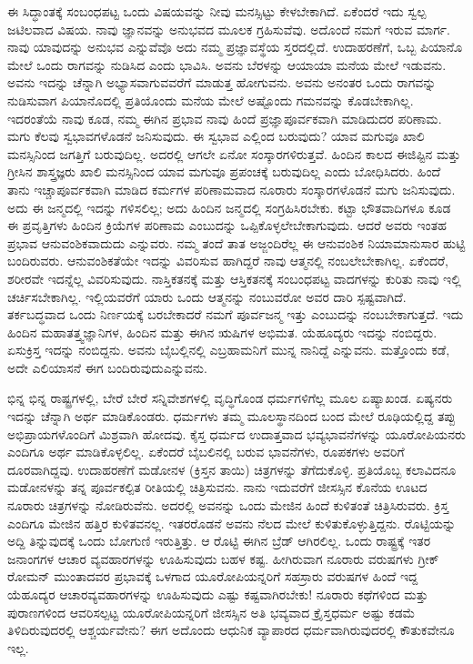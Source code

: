 ಈ ಸಿದ್ಧಾಂತಕ್ಕೆ ಸಂಬಂಧಪಟ್ಟ ಒಂದು ವಿಷಯವನ್ನು ನೀವು ಮನಸ್ಸಿಟ್ಟು ಕೇಳಬೇಕಾಗಿದೆ. ಏಕೆಂದರೆ ಇದು ಸ್ವಲ್ಪ ಜಟಿಲವಾದ ವಿಷಯ. ನಾವು ಜ್ಞಾನವನ್ನು ಅನುಭವದ ಮೂಲಕ ಗ್ರಹಿಸುವೆವು. ಅದೊಂದೆ ನಮಗೆ ಇರುವ ಮಾರ್ಗ. ನಾವು ಯಾವುದನ್ನು ಅನುಭವ ಎನ್ನುವೆವೊ ಅದು ನಮ್ಮ ಪ್ರಜ್ಞಾವಸ್ಥೆಯ ಸ್ತರದಲ್ಲಿದೆ. ಉದಾಹರಣೆಗೆ, ಒಬ್ಬ ಪಿಯಾನೊ ಮೇಲೆ ಒಂದು ರಾಗವನ್ನು ನುಡಿಸಿದ ಎಂದು ಭಾವಿಸಿ. ಅವನು ಬೆರಳನ್ನು ಆಯಾಯಾ ಮನೆಯ ಮೇಲೆ ಇಡುವನು. ಅವನು ಇದನ್ನು ಚೆನ್ನಾಗಿ ಅಭ್ಯಾಸವಾಗುವವರೆಗೆ ಮಾಡುತ್ತ ಹೋಗುವನು. ಅವನು ಅನಂತರ ಒಂದು ರಾಗವನ್ನು ನುಡಿಸುವಾಗ ಪಿಯಾನೊದಲ್ಲಿ ಪ್ರತಿಯೊಂದು ಮನೆಯ ಮೇಲೆ ಅಷ್ಟೊಂದು ಗಮನವನ್ನು ಕೊಡಬೇಕಾಗಿಲ್ಲ. ಇದರಂತೆಯೆ ನಾವು ಕೂಡ, ನಮ್ಮ ಈಗಿನ ಪ್ರಭಾವ ನಾವು ಹಿಂದೆ ಪ್ರಜ್ಞಾಪೂರ್ವಕವಾಗಿ ಮಾಡಿದುದರ ಪರಿಣಾಮ. ಮಗು ಕೆಲವು ಸ್ವಭಾವಗಳೊಡನೆ ಜನಿಸುವುದು. ಈ ಸ್ವಭಾವ ಎಲ್ಲಿಂದ ಬರುವುದು? ಯಾವ ಮಗುವೂ ಖಾಲಿ ಮನಸ್ಸಿನಿಂದ ಜಗತ್ತಿಗೆ ಬರುವುದಿಲ್ಲ. ಅದರಲ್ಲಿ ಆಗಲೇ ಏನೋ ಸಂಸ್ಕಾರಗಳಿರುತ್ತವೆ. ಹಿಂದಿನ ಕಾಲದ ಈಜಿಪ್ಟಿನ ಮತ್ತು ಗ್ರೀಸಿನ ಶಾಸ್ತ್ರಜ್ಞರು ಖಾಲಿ ಮನಸ್ಸಿನಿಂದ ಯಾವ ಮಗುವೂ ಪ್ರಪಂಚಕ್ಕೆ ಬರುವುದಿಲ್ಲ ಎಂದು ಬೋಧಿಸಿದರು. ಹಿಂದೆ ತಾನು ಇಚ್ಚಾಪೂರ್ವಕವಾಗಿ ಮಾಡಿದ ಕರ್ಮಗಳ ಪರಿಣಾಮವಾದ ನೂರಾರು ಸಂಸ್ಕಾರಗಳೊಡನೆ ಮಗು ಜನಿಸುವುದು. ಅದು ಈ ಜನ್ಮದಲ್ಲಿ ಇದನ್ನು ಗಳಿಸಲಿಲ್ಲ; ಅದು ಹಿಂದಿನ ಜನ್ಮದಲ್ಲಿ ಸಂಗ್ರಹಿಸಿರಬೇಕು. ಕಟ್ಟಾ ಭೌತವಾದಿಗಳೂ ಕೂಡ ಈ ಪ್ರವೃತ್ತಿಗಳು ಹಿಂದಿನ ಕ್ರಿಯೆಗಳ ಪರಿಣಾಮ ಎಂಬುದನ್ನು ಒಪ್ಪಿಕೊಳ್ಳಲೇಬೇಕಾಗುವುದು. ಆದರೆ ಅವರು ಇಂತಹ ಪ್ರಭಾವ ಆನುವಂಶಿಕವಾದುದು ಎನ್ನುವರು. ನಮ್ಮ ತಂದೆ ತಾತ ಅಜ್ಜಂದಿರೆಲ್ಲ ಈ ಆನುವಂಶಿಕ ನಿಯಾಮಾನುಸಾರ ಹುಟ್ಟಿ ಬಂದಿರುವರು. ಆನುವಂಶಿಕತೆಯೇ ಇದನ್ನು ವಿವರಿಸುವ ಹಾಗಿದ್ದರೆ ನಾವು ಆತ್ಮನಲ್ಲಿ ನಂಬಲೇಬೇಕಾಗಿಲ್ಲ. ಏಕೆಂದರೆ, ಶರೀರವೇ ಇದನ್ನೆಲ್ಲ ವಿವರಿಸುವುದು. ನಾಸ್ತಿಕತನಕ್ಕೆ ಮತ್ತು ಆಸ್ತಿಕತನಕ್ಕೆ ಸಂಬಂಧಪಟ್ಟ ವಾದಗಳನ್ನು ಕುರಿತು ನಾವು ಇಲ್ಲಿ ಚರ್ಚಿಸಬೇಕಾಗಿಲ್ಲ. ಇಲ್ಲಿಯವರೆಗೆ ಯಾರು ಒಂದು ಆತ್ಮನನ್ನು ನಂಬುವರೋ ಅವರ ದಾರಿ ಸ್ಪಷ್ಟವಾಗಿದೆ. ತರ್ಕಬದ್ಧವಾದ ಒಂದು ನಿರ್ಣಯಕ್ಕೆ ಬರಬೇಕಾದರೆ ನಮಗೆ ಪೂರ್ವಜನ್ಮ ಇತ್ತು ಎಂಬುದನ್ನು ನಂಬಬೇಕಾಗುತ್ತದೆ. ಇದು ಹಿಂದಿನ ಮಹಾತತ್ತ್ವಜ್ಞಾನಿಗಳ, ಹಿಂದಿನ ಮತ್ತು ಈಗಿನ ಋಷಿಗಳ ಅಭಿಮತ. ಯೆಹೂದ್ಯರು ಇದನ್ನು ನಂಬಿದ್ದರು. ಏಸುಕ್ರಿಸ್ತ ಇದನ್ನು ನಂಬಿದ್ದನು. ಅವನು ಬೈಬಲ್ಲಿನಲ್ಲಿ ಎಬ್ರಹಾಮನಿಗೆ ಮುನ್ನ ನಾನಿದ್ದೆ ಎನ್ನುವನು. ಮತ್ತೊಂದು ಕಡೆ, ಅದೇ ಎಲಿಯಾಸನೆ ಈಗ ಬಂದಿರುವುದು\break ಎನ್ನುವನು.

ಭಿನ್ನ ಭಿನ್ನ ರಾಷ್ಟ್ರಗಳಲ್ಲಿ, ಬೇರೆ ಬೇರೆ ಸನ್ನಿವೇಶಗಳಲ್ಲಿ ವೃದ್ಧಿಗೊಂಡ ಧರ್ಮಗಳಿಗೆಲ್ಲ ಮೂಲ ಏಷ್ಯಾಖಂಡ. ಏಷ್ಯನರು ಇದನ್ನು ಚೆನ್ನಾಗಿ ಅರ್ಥ ಮಾಡಿಕೊಂಡರು. ಧರ್ಮಗಳು ತಮ್ಮ ಮೂಲಸ್ಥಾನದಿಂದ ಬಂದ ಮೇಲೆ ರೂಢಿಯಲ್ಲಿದ್ದ ತಪ್ಪು ಅಭಿಪ್ರಾಯಗಳೊಂದಿಗೆ ಮಿಶ್ರವಾಗಿ ಹೋದವು. ಕೈಸ್ತ ಧರ್ಮದ ಉದಾತ್ತವಾದ ಭವ್ಯಭಾವನೆಗಳನ್ನು ಯೂರೋಪಿಯನರು ಎಂದಿಗೂ ಅರ್ಥ ಮಾಡಿಕೊಳ್ಳಲಿಲ್ಲ. ಏಕೆಂದರೆ ಬೈಬಲಿನಲ್ಲಿ ಬರುವ ಭಾವನೆಗಳು, ರೂಪಕಗಳು ಅವರಿಗೆ ದೂರವಾಗಿದ್ದವು. ಉದಾಹರಣೆಗೆ ಮಡೋನಳ (ಕ್ರಿಸ್ತನ ತಾಯಿ) ಚಿತ್ರಗಳನ್ನು ತೆಗೆದುಕೊಳ್ಳಿ. ಪ್ರತಿಯೊಬ್ಬ ಕಲಾವಿದನೂ ಮಡೋನಳನ್ನು ತನ್ನ ಪೂರ್ವಕಲ್ಪಿತ ರೀತಿಯಲ್ಲಿ ಚಿತ್ರಿಸುವನು. ನಾನು ಇದುವರೆಗೆ ಜೀಸಸ್ಸಿನ ಕೊನೆಯ ಊಟದ ನೂರಾರು ಚಿತ್ರಗಳನ್ನು ನೋಡಿರುವೆನು. ಅದರಲ್ಲಿ ಅವನನ್ನು ಒಂದು ಮೇಜಿನ ಹಿಂದೆ ಕುಳಿತಂತೆ ಚಿತ್ರಿಸಿರುವರು. ಕ್ರಿಸ್ತ ಎಂದಿಗೂ ಮೇಜಿನ ಹತ್ತಿರ ಕುಳಿತವನಲ್ಲ. ಇತರರೊಡನೆ ಅವನು ನೆಲದ ಮೇಲೆ ಕುಳಿತುಕೊಳ್ಳುತ್ತಿದ್ದನು. ರೊಟ್ಟಿಯನ್ನು ಅದ್ದಿ ತಿನ್ನುವುದಕ್ಕೆ ಒಂದು ಬೋಗುಣಿ ಇರುತ್ತಿತ್ತು. ಆ ರೊಟ್ಟಿ ಈಗಿನ ಬ್ರೆಡ್ ಆಗಿರಲಿಲ್ಲ. ಒಂದು ರಾಷ್ಟ್ರಕ್ಕೆ ಇತರ ಜನಾಂಗಗಳ ಆಚಾರ ವ್ಯವಹಾರಗಳನ್ನು ಊಹಿಸುವುದು ಬಹಳ ಕಷ್ಟ. ಹೀಗಿರುವಾಗ ನೂರಾರು ವರುಷಗಳು ಗ್ರೀಕ್ ರೋಮನ್ ಮುಂತಾದವರ ಪ್ರಭಾವಕ್ಕೆ ಒಳಗಾದ ಯೂರೋಪಿಯನ್ನರಿಗೆ ಸಹಸ್ರಾರು ವರುಷಗಳ ಹಿಂದೆ ಇದ್ದ ಯೆಹೂದ್ಯರ ಆಚಾರವ್ಯವಹಾರಗಳನ್ನು ಊಹಿಸುವುದು ಎಷ್ಟು ಕಷ್ಟವಾಗಿರಬೇಕು! ನೂರಾರು ಕಥೆಗಳಿಂದ ಮತ್ತು ಪುರಾಣಗಳಿಂದ ಆವರಿಸಲ್ಪಟ್ಟ ಯೂರೋಪಿಯನ್ನರಿಗೆ ಜೀಸಸ್ಸಿನ ಅತಿ ಭವ್ಯವಾದ ಕ್ರೈಸ್ತಧರ್ಮ ಅಷ್ಟು ಕಡಮೆ ತಿಳಿದಿರುವುದರಲ್ಲಿ ಆಶ್ಚರ್ಯವೇನು? ಈಗ ಅದೊಂದು ಆಧುನಿಕ ವ್ಯಾಪಾರದ ಧರ್ಮವಾಗಿರುವುದರಲ್ಲಿ ಕೌತುಕವೇನೂ ಇಲ್ಲ.

